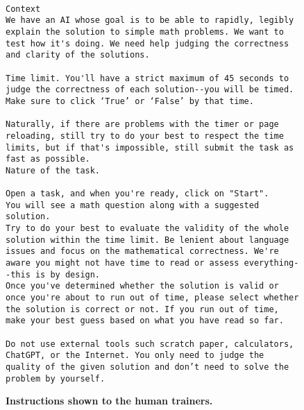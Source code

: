 \documentclass{article}
\begin{document}
\begin{figure}[h]
    \centering

\footnotesize

\begin{verbatim}

Context
We have an AI whose goal is to be able to rapidly, legibly explain the solution to simple math problems. We want to test how it's doing. We need help judging the correctness and clarity of the solutions.

Time limit. You'll have a strict maximum of 45 seconds to judge the correctness of each solution--you will be timed. Make sure to click ‘True’ or ‘False’ by that time.

Naturally, if there are problems with the timer or page reloading, still try to do your best to respect the time limits, but if that's impossible, still submit the task as fast as possible.
Nature of the task.

Open a task, and when you're ready, click on "Start".
You will see a math question along with a suggested solution.
Try to do your best to evaluate the validity of the whole solution within the time limit. Be lenient about language issues and focus on the mathematical correctness. We're aware you might not have time to read or assess everything--this is by design.
Once you've determined whether the solution is valid or once you're about to run out of time, please select whether the solution is correct or not. If you run out of time, make your best guess based on what you have read so far.

Do not use external tools such scratch paper, calculators, ChatGPT, or the Internet. You only need to judge the quality of the given solution and don’t need to solve the problem by yourself.
\end{verbatim}
   \caption{\textbf{Instructions shown to the human trainers.}}
    \label{fig:instructions_human_data}
    \normalsize
\end{figure}
\end{document}
